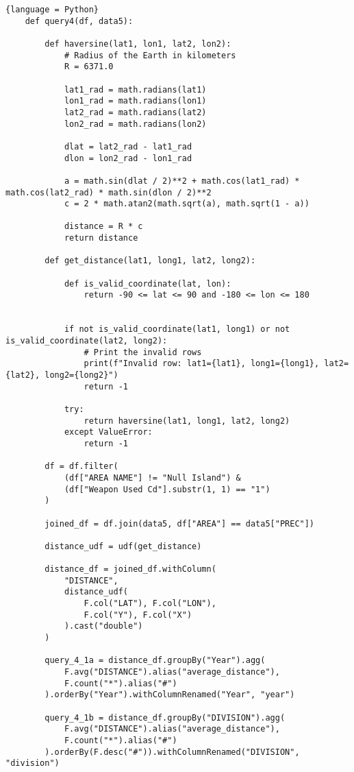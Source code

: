\documentclass{article}
\begin{document}
\begin{lstlisting}{language = Python}
    def query4(df, data5):

        def haversine(lat1, lon1, lat2, lon2):
            # Radius of the Earth in kilometers
            R = 6371.0

            lat1_rad = math.radians(lat1)
            lon1_rad = math.radians(lon1)
            lat2_rad = math.radians(lat2)
            lon2_rad = math.radians(lon2)

            dlat = lat2_rad - lat1_rad
            dlon = lon2_rad - lon1_rad

            a = math.sin(dlat / 2)**2 + math.cos(lat1_rad) * math.cos(lat2_rad) * math.sin(dlon / 2)**2
            c = 2 * math.atan2(math.sqrt(a), math.sqrt(1 - a))

            distance = R * c
            return distance

        def get_distance(lat1, long1, lat2, long2):

            def is_valid_coordinate(lat, lon):
                return -90 <= lat <= 90 and -180 <= lon <= 180


            if not is_valid_coordinate(lat1, long1) or not is_valid_coordinate(lat2, long2):
                # Print the invalid rows
                print(f"Invalid row: lat1={lat1}, long1={long1}, lat2={lat2}, long2={long2}")
                return -1

            try:
                return haversine(lat1, long1, lat2, long2)
            except ValueError:
                return -1

        df = df.filter(
            (df["AREA NAME"] != "Null Island") &
            (df["Weapon Used Cd"].substr(1, 1) == "1")
        )

        joined_df = df.join(data5, df["AREA"] == data5["PREC"])

        distance_udf = udf(get_distance)

        distance_df = joined_df.withColumn(
            "DISTANCE",
            distance_udf(
                F.col("LAT"), F.col("LON"),
                F.col("Y"), F.col("X")
            ).cast("double")
        )

        query_4_1a = distance_df.groupBy("Year").agg(
            F.avg("DISTANCE").alias("average_distance"),
            F.count("*").alias("#")
        ).orderBy("Year").withColumnRenamed("Year", "year")

        query_4_1b = distance_df.groupBy("DIVISION").agg(
            F.avg("DISTANCE").alias("average_distance"),
            F.count("*").alias("#")
        ).orderBy(F.desc("#")).withColumnRenamed("DIVISION", "division")


\end{lstlisting}
\end{document}
